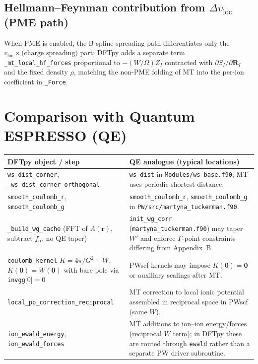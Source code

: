 \documentclass[11pt,a4paper]{article}
\begin{document}
\subsection{Hellmann--Feynman contribution from $\Delta v_{\mathrm{loc}}$ (PME path)}

When PME is enabled, the B-spline spreading path differentiates only the
$v_{\mathrm{loc}}\times\text{(charge spreading)}$ part; DFTpy adds a separate term
\texttt{\_mt\_local\_hf\_forces} proportional to $-(W/\Omega)Z_I$ contracted with
$\partial S_I/\partial \mathbf R_I$ and the fixed density $\rho$, matching the
non-PME folding of MT into the per-ion coefficient in \texttt{\_Force}.

\section{Comparison with Quantum ESPRESSO (QE)}

\begin{longtable}{@{}p{}p{}@{}}
\toprule
\textbf{DFTpy object / step} & \textbf{QE analogue (typical locations)} \\
\midrule
\endhead
\texttt{ws\_dist\_corner}, \texttt{\_ws\_dist\_corner\_orthogonal}
  & \texttt{ws\_dist} in \texttt{Modules/ws\_base.f90}; MT uses periodic shortest distance. \\
\texttt{smooth\_coulomb\_r}, \texttt{smooth\_coulomb\_g}
  & \texttt{smooth\_coulomb\_r}, \texttt{smooth\_coulomb\_g} in
    \texttt{PW/src/martyna\_tuckerman.f90}. \\
\texttt{\_build\_wg\_cache} (FFT of $A(\mathbf r)$, subtract $\tilde f_\alpha$, no QE taper)
  & \texttt{init\_wg\_corr} (\texttt{martyna\_tuckerman.f90}) may taper $W'$ and enforce
    $\Gamma$-point constraints differing from Appendix~B. \\
\texttt{coulomb\_kernel} $K=4\pi/G^2+W$, $K(\mathbf 0)=W(\mathbf 0)$ with bare pole via \texttt{invgg}[0]$=0$
  & PWscf kernels may impose $K(\mathbf 0)=\mathbf 0$ or auxiliary scalings after MT. \\
\texttt{local\_pp\_correction\_reciprocal}
  & MT correction to local ionic potential assembled in reciprocal space in PWscf
    (same $W$). \\
\texttt{ion\_ewald\_energy}, \texttt{ion\_ewald\_forces}
  & MT additions to ion--ion energy/forces (reciprocal $W$ term); in DFTpy these are
    routed through \texttt{ewald} rather than a separate PW driver subroutine. \\
\bottomrule
\end{longtable}
\end{document}
